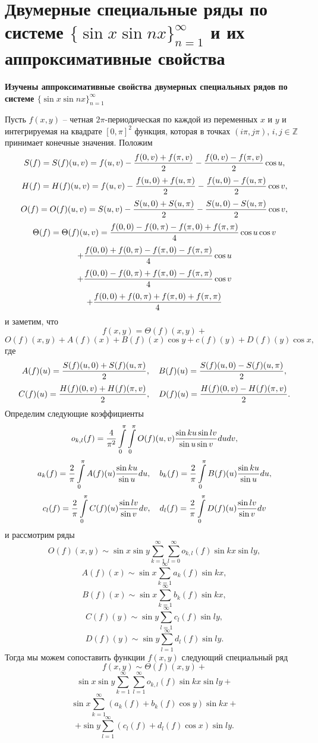 \section{Двумерные  специальные ряды по системе $\{\sin x\sin nx\}_{n=1}^\infty$  и их аппроксимативные свойства}
\textbf{Изучены аппроксимативные свойства двумерных специальных рядов по системе $\{\sin x\sin nx\}_{n=1}^\infty$}


Пусть $f(x,y)$ -- четная $2\pi$-периодическая по каждой из переменных $x$ и $y$ и интегрируемая на квадрате $[0,\pi]^2$ функция, которая в точках $(i\pi,j\pi)$, $i,j\in \mathbb{Z}$ принимает конечные значения. Положим
$$
S(f)=S(f)(u,v)=f(u,v)-{f(0,v)+f(\pi,v)\over2}-{f(0,v)-f(\pi,v)\over2}\cos u,
$$
$$
H(f)=H(f)(u,v)=f(u,v)-{f(u,0)+f(u,\pi)\over2}-{f(u,0)-f(u,\pi)\over2}\cos v,
$$
$$
O(f)=O(f)(u,v)=S(u,v)-{S(u,0)+S(u,\pi)\over2}-{S(u,0)-S(u,\pi)\over2}\cos v,
$$
$$
\Theta(f)=\Theta(f)(u,v)={f(0,0)-f(0,\pi)-f(\pi,0)+f(\pi,\pi)\over4}\cos u\cos v
$$
$$
+{f(0,0)+f(0,\pi)-f(\pi,0)-f(\pi,\pi)\over4}\cos u
$$
$$
+{f(0,0)-f(0,\pi)+f(\pi,0)-f(\pi,\pi)\over4}\cos v
$$
$$
+{f(0,0)+f(0,\pi)+f(\pi,0)+f(\pi,\pi)\over4}
$$
и заметим, что
$$
f(x,y)=\Theta(f)(x,y)+
$$
$$
O(f)(x,y)+A(f)(x)+B(f)(x)\cos y+c(f)(y)+D(f)(y)\cos x,
$$
где
$$
A(f)(u)={S(f)(u,0)+S(f)(u,\pi)\over2},\quad B(f)(u)={S(f)(u,0)-S(f)(u,\pi)\over2},
$$
$$
C(f)(u)={H(f)(0,v)+H(f)(\pi,v)\over2},\quad D(f)(u)={H(f)(0,v)-H(f)(\pi,v)\over2}.
$$
Определим следующие коэффициенты
$$
o_{k,l}(f)=\frac4{\pi^2}\int\limits_0^\pi\int\limits_0^\pi
 O(f)(u,v){\sin ku\sin lv\over\sin u\sin v}dudv,
 $$
$$
a_k(f)=\frac2{\pi}\int\limits_0^\pi A(f)(u){\sin ku\over\sin u}du,\quad
b_k(f)=\frac2{\pi}\int\limits_0^\pi B(f)(u){\sin ku\over\sin u}du,
$$
$$
c_l(f)=\frac2{\pi}\int\limits_0^\pi C(f)(u){\sin lv\over\sin v}dv,\quad
d_l(f)=\frac2{\pi}\int\limits_0^\pi D(f)(u){\sin lv\over\sin v}dv
$$
и рассмотрим ряды
$$
O(f)(x,y)\sim \sin x\sin y\sum_{k=1}^\infty\sum_{l=0}^\infty o_{k,l}(f)\sin kx\sin ly,
$$
$$
A(f)(x)\sim \sin x\sum_{k=1}^\infty a_{k}(f)\sin kx,
$$
$$
B(f)(x)\sim \sin x\sum_{k=1}^\infty b_{k}(f)\sin kx,
$$
$$
C(f)(y)\sim \sin y\sum_{l=1}^\infty c_{l}(f)\sin ly,
$$
$$
D(f)(y)\sim \sin y\sum_{l=1}^\infty d_{l}(f)\sin ly.
$$
Тогда  мы можем сопоставить  функции $f(x,y)$ следующий специальный ряд
$$
f(x,y)\sim \Theta(f)(x,y)+
$$
$$
 \sin x\sin y\sum_{k=1}^\infty\sum_{l=1}^\infty o_{k,l}(f)\sin kx\sin ly+
$$
$$
\sin x\sum_{k=1}^\infty (a_{k}(f)+b_{k}(f)\cos y)\sin kx+
$$
\begin{equation}
\label{eq.1.2.4.1}
 +\sin y\sum_{l=1}^\infty (c_{l}(f)+ d_{l}(f)\cos x)\sin ly.
\end{equation}
